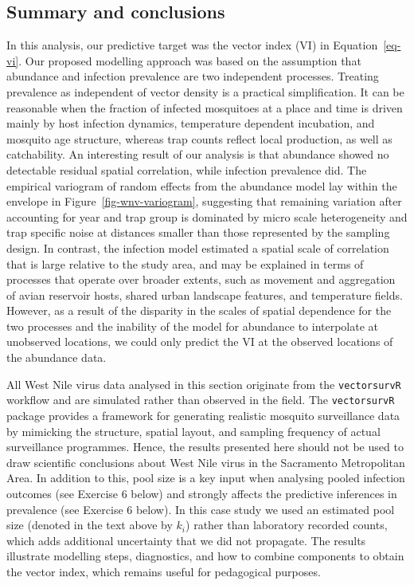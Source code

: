 \documentclass[
  letterpaper,
]{krantz}
\begin{document}
\subsection{Summary and conclusions}\label{sec-summary-wnv}

In this analysis, our predictive target was the vector index (VI) in
Equation~\ref{eq-vi}. Our proposed modelling approach was based on the
assumption that abundance and infection prevalence are two independent
processes. Treating prevalence as independent of vector density is a
practical simplification. It can be reasonable when the fraction of
infected mosquitoes at a place and time is driven mainly by host
infection dynamics, temperature dependent incubation, and mosquito age
structure, whereas trap counts reflect local production, as well as
catchability. An interesting result of our analysis is that abundance
showed no detectable residual spatial correlation, while infection
prevalence did. The empirical variogram of random effects from the
abundance model lay within the envelope in
Figure~\ref{fig-wnv-variogram}, suggesting that remaining variation
after accounting for year and trap group is dominated by micro scale
heterogeneity and trap specific noise at distances smaller than those
represented by the sampling design. In contrast, the infection model
estimated a spatial scale of correlation that is large relative to the
study area, and may be explained in terms of processes that operate over
broader extents, such as movement and aggregation of avian reservoir
hosts, shared urban landscape features, and temperature fields. However,
as a result of the disparity in the scales of spatial dependence for the
two processes and the inability of the model for abundance to
interpolate at unobserved locations, we could only predict the VI at the
observed locations of the abundance data.

All West Nile virus data analysed in this section originate from the
\texttt{vectorsurvR} workflow and are simulated rather than observed in
the field. The \texttt{vectorsurvR} package provides a framework for
generating realistic mosquito surveillance data by mimicking the
structure, spatial layout, and sampling frequency of actual surveillance
programmes. Hence, the results presented here should not be used to draw
scientific conclusions about West Nile virus in the Sacramento
Metropolitan Area. In addition to this, pool size is a key input when
analysing pooled infection outcomes (see Exercise 6 below) and strongly
affects the predictive inferences in prevalence (see Exercise 6 below).
In this case study we used an estimated pool size (denoted in the text
above by \(k_i\)) rather than laboratory recorded counts, which adds
additional uncertainty that we did not propagate. The results illustrate
modelling steps, diagnostics, and how to combine components to obtain
the vector index, which remains useful for pedagogical purposes.
\end{document}
